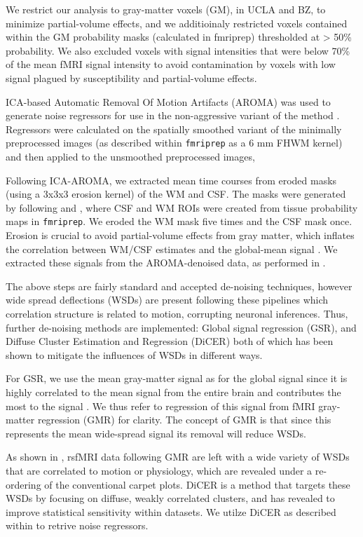\documentclass[oneside]{zHenriquesLab-StyleBioRxiv}
\begin{document}
We restrict our analysis to gray-matter voxels (GM), in UCLA and BZ, to minimize partial-volume effects, and we additioinaly restricted voxels contained within the GM probability masks (calculated in fmriprep) thresholded at > 50\% probability. We also excluded voxels with signal intensities that were below 70\% of the mean fMRI signal intensity to avoid contamination by voxels with low signal plagued by susceptibility and partial-volume effects.

ICA-based Automatic Removal Of Motion Artifacts (AROMA) was used to generate noise regressors for use in the non-aggressive variant of the method \cite{aroma}. Regressors were calculated on the spatially smoothed variant of the minimally preprocessed images (as described within \verb|fmriprep| as a $6$ mm FHWM kernel) and then applied to the unsmoothed preprocessed images,

Following ICA-AROMA, we extracted mean time courses from eroded masks (using a 3x3x3 erosion kernel) of the WM and CSF. The masks were generated by following \citet{Parkes:2018dz} and \citet{power2017sources}, where CSF and WM ROIs were created from tissue probability maps in \verb|fmriprep|. We eroded the WM mask five times and the CSF mask once. Erosion is crucial to avoid partial-volume effects from gray matter, which inflates the correlation between WM/CSF estimates and the global-mean signal \cite{power_fd_dvars,Parkes:2018dz}. We extracted these signals from the AROMA-denoised data, as performed in \citet{aroma}.

The above steps are fairly standard and accepted de-noising techniques, however wide spread deflections (WSDs) are present following these pipelines which correlation structure is related to motion, corrupting neuronal inferences. Thus, further de-noising methods are implemented: Global signal regression (GSR), and Diffuse Cluster Estimation and Regression (DiCER) both of which has been shown to mitigate the influences of WSDs in different ways. 

For GSR, we use the mean gray-matter signal as for the global signal since it is highly correlated to the mean signal from the entire brain and contributes the most to the signal \cite{power2017sources,Glasser:2018dt}. We thus refer to regression of this signal from fMRI gray-matter regression (GMR) for clarity. The concept of GMR is that since this represents the mean wide-spread signal its removal will reduce WSDs.

As shown in \cite{aquino2019identifying}, rsfMRI data following GMR are left with a wide variety of WSDs that are correlated to motion or physiology, which are  revealed under a re-ordering of the conventional carpet plots. DiCER is a method that targets these WSDs by focusing on diffuse, weakly correlated clusters, and has revealed to improve statistical sensitivity within datasets. We utilze DiCER as described within \citet{aquino2019identifying} to retrive noise regressors.
\end{document}
